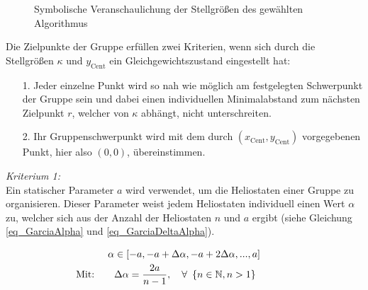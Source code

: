 \enlargethispage{\baselineskip}
\begin{figure}[h!]
    \centering
    \setlength{\fboxsep}{1pt}
    \setlength{\fboxrule}{1pt}
    \caption[Symbolische Veranschaulichung der Stellgrößen des gewählten Algorithmus]{Symbolische Veranschaulichung der Stellgrößen des gewählten Algorithmus \cite[S.7]{Garcia2}}
    \label{fig_DispersionVeranschaulichung}
\end{figure}

Die Zielpunkte der Gruppe erfüllen zwei Kriterien, wenn sich durch die Stellgrößen $\kappa$ und $y_{\mathrm{Cent}}$ ein Gleichgewichtszustand eingestellt hat:
\begin{itemize}
\item[1.] Jeder einzelne Punkt wird so nah wie möglich am festgelegten Schwerpunkt der Gruppe sein und dabei einen individuellen Minimalabstand zum nächsten Zielpunkt $r$, welcher von $\kappa$ abhängt, nicht unterschreiten.
\item[2.] Ihr Gruppenschwerpunkt wird mit dem durch $(x_{\mathrm{Cent}}, y_{\mathrm{Cent}})$ vorgegebenen Punkt, hier also $(0,0)$, übereinstimmen.
\end{itemize}

\textit{Kriterium 1:}\\
Ein statischer Parameter $a$ wird verwendet, um die Heliostaten einer Gruppe zu organisieren.
Dieser Parameter weist jedem Heliostaten individuell einen Wert $\alpha$ zu, welcher sich aus der Anzahl der Heliostaten $n$ und $a$ ergibt (siehe Gleichung \ref{eq_GarciaAlpha} und \ref{eq_GarciaDeltaAlpha}).

\begin{gather}
    \alpha \in \left[-a, -a+\Delta\alpha, -a+2\Delta\alpha,..., a\right] \label{eq_GarciaAlpha}\\
    \text{\myequations{\quad Berechnung des individuellen Heliostatenparameters $\alpha$}}
\text{Mit:\qquad}\Delta\alpha = \frac{2a}{n-1}, \quad \forall~\left\{n \in \mathbb{N}, n > 1 \right\} \qquad\qquad \label{eq_GarciaDeltaAlpha}
\end{gather}

